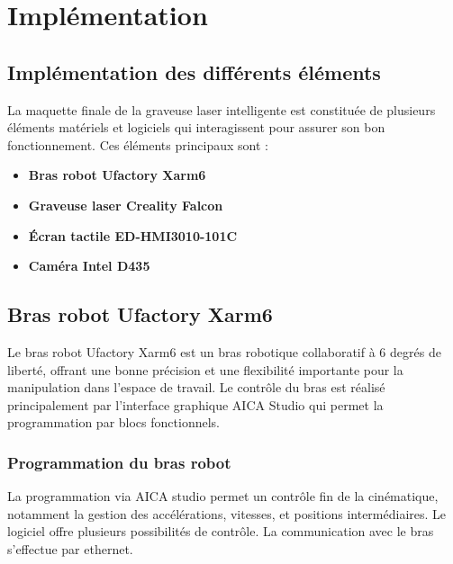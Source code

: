 \chapter{Implémentation}

\section{Implémentation des différents éléments}

La maquette finale de la graveuse laser intelligente est constituée de plusieurs éléments matériels et logiciels qui interagissent pour assurer son bon fonctionnement. Ces éléments principaux sont :

\begin{itemize}
    \item \textbf{Bras robot Ufactory Xarm6}
    \item \textbf{Graveuse laser Creality Falcon}
    \item \textbf{Écran tactile ED-HMI3010-101C}
    \item \textbf{Caméra Intel D435}
\end{itemize}

\section{Bras robot Ufactory Xarm6}

Le bras robot Ufactory Xarm6 est un bras robotique collaboratif à 6 degrés de liberté, offrant une bonne précision et une flexibilité importante pour la manipulation dans l'espace de travail. Le contrôle du bras est réalisé principalement par l’interface graphique AICA Studio qui permet la programmation par blocs fonctionnels.

\subsection{Programmation du bras robot}
La programmation via AICA studio permet un contrôle fin de la cinématique, notamment la gestion des accélérations, vitesses, et positions intermédiaires. Le logiciel offre plusieurs possibilités de contrôle. La communication avec le bras s’effectue par ethernet.

